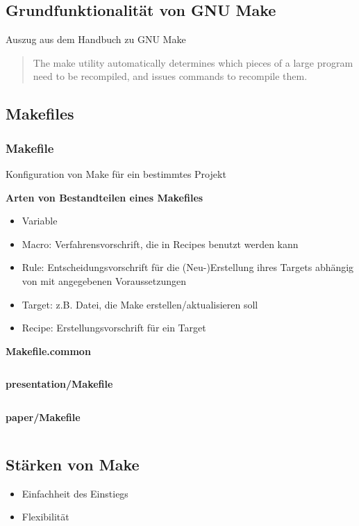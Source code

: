 \subsection{Grundfunktionalität von GNU Make}
\begin{frame}
\cite{GNU_Make_manual} Auszug aus dem Handbuch zu GNU Make
\begin{quote}
The make utility automatically determines which pieces of a large program need to be recompiled, and issues commands to recompile them.
\end{quote}
\end{frame}

\subsection{Makefiles}
\begin{frame}
\frametitle{Makefile} Konfiguration von Make für ein bestimmtes Projekt

\textbf{Arten von Bestandteilen eines Makefiles}
\begin{itemize}
	\item Variable
	\item Macro: Verfahrensvorschrift, die in Recipes benutzt werden kann
	\item Rule: Entscheidungsvorschrift für die (Neu-)Erstellung ihres Targets abhängig von mit angegebenen Voraussetzungen
	\item Target: z.B. Datei, die Make erstellen/aktualisieren soll
	\item Recipe: Erstellungsvorschrift für ein Target
\end{itemize}
\end{frame}

\begin{frame}
	\begin{multicols}{2}
	\mymintedstyle

	{\tiny\textbf{Makefile.common}}
	\inputminted[linenos=true,stepnumber=5]{make}{../Makefile.common}
	\vfill\eject

	{\tiny\textbf{presentation/Makefile}}
	\inputminted[linenos=true,stepnumber=5]{make}{Makefile}

	{\tiny\textbf{paper/Makefile}}
	\inputminted[linenos=true,stepnumber=5]{make}{../paper/Makefile}

	\end{multicols}
\end{frame}

\subsection{Stärken von Make}
\begin{frame}
	\begin{itemize}
		\item Einfachheit des Einstiegs
		\item Flexibilität
	\end{itemize}
\end{frame}

